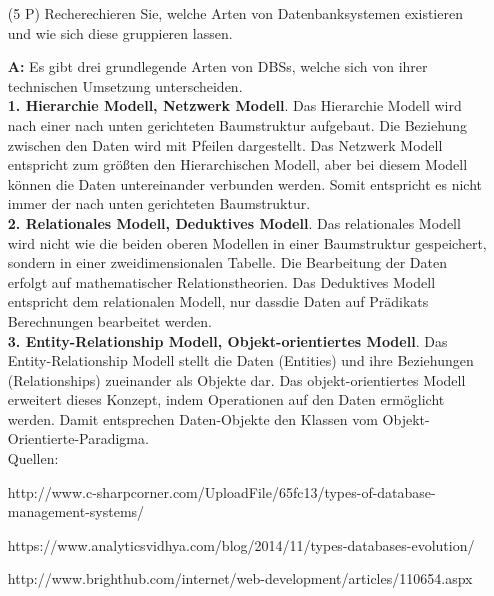 \documentclass[12pt]{report}
\newcommand{\answer}{\textbf{A:}}
\begin{document}
\begin{enumerate}
\item[(5 P)] Recherechieren Sie, welche Arten von Datenbanksystemen existieren und wie sich diese gruppieren lassen.
\item[\answer]
  Es gibt drei grundlegende Arten von DBSs, welche sich von ihrer technischen Umsetzung unterscheiden.\\

  \textbf{1. Hierarchie Modell, Netzwerk Modell}. Das Hierarchie Modell wird nach einer nach unten gerichteten Baumstruktur aufgebaut. Die Beziehung zwischen den Daten wird mit Pfeilen dargestellt. Das Netzwerk Modell entspricht zum größten den Hierarchischen Modell, aber bei diesem Modell können die Daten untereinander verbunden werden. Somit entspricht es nicht immer der nach unten gerichteten Baumstruktur.\\

  \textbf{2. Relationales Modell, Deduktives Modell}. Das relationales Modell wird nicht wie die beiden oberen Modellen in einer Baumstruktur gespeichert, sondern in einer zweidimensionalen Tabelle. Die Bearbeitung der Daten erfolgt auf mathematischer Relationstheorien. Das Deduktives Modell entspricht dem relationalen Modell, nur dassdie Daten auf Prädikats Berechnungen bearbeitet werden.\\

  \textbf{3. Entity-Relationship Modell, Objekt-orientiertes Modell}. Das Entity-Relationship Modell stellt die Daten (Entities) und ihre Beziehungen (Relationships) zueinander als Objekte dar. Das objekt-orientiertes Modell erweitert dieses Konzept, indem Operationen auf den Daten ermöglicht werden. Damit entsprechen Daten-Objekte den Klassen vom Objekt-Orientierte-Paradigma.\\

  Quellen:

  http://www.c-sharpcorner.com/UploadFile/65fc13/types-of-database-management-systems/

  https://www.analyticsvidhya.com/blog/2014/11/types-databases-evolution/

  http://www.brighthub.com/internet/web-development/articles/110654.aspx


\end{enumerate}
\end{document}
